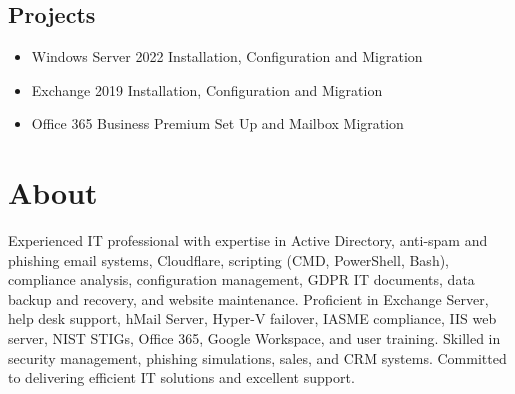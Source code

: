 \documentclass[letterpaper,10pt]{article}
\begin{document}
\begin{center}
\begin{minipage}[t]{0.5\textwidth}
		\section*{Projects}
		\begin{itemize}
			\item Windows Server 2022 Installation, Configuration and Migration
			\item Exchange 2019 Installation, Configuration and Migration
			\item Office 365 Business Premium Set Up and Mailbox Migration
			\end{itemize}
	\end{minipage}
\end{center}
			
			\section*{About}
			Experienced IT professional with expertise in Active Directory, anti-spam and phishing email systems, Cloudflare, scripting (CMD, PowerShell, Bash), compliance analysis, configuration management, GDPR IT documents, data backup and recovery, and website maintenance. Proficient in Exchange Server, help desk support, hMail Server, Hyper-V failover, IASME compliance, IIS web server, NIST STIGs, Office 365, Google Workspace, and user training. Skilled in security management, phishing simulations, sales, and CRM systems. Committed to delivering efficient IT solutions and excellent support.
					
		
\end{document}
